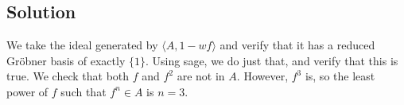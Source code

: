 \documentclass{article}
\theoremstyle{definition}
\begin{document}
\subsection*{Solution}
We take the ideal generated by $\langle A, 1-wf\rangle$ and verify that 
it has a reduced Gr{\"o}bner basis of exactly $\{1\}$. Using sage, we do just 
that, and verify that this is true. We check that both $f$ and $f^2$ are not in $A$.
However, $f^3$ is, so the least power of $f$ such that $f^n \in A$ is $n = 3$.
\end{document}
